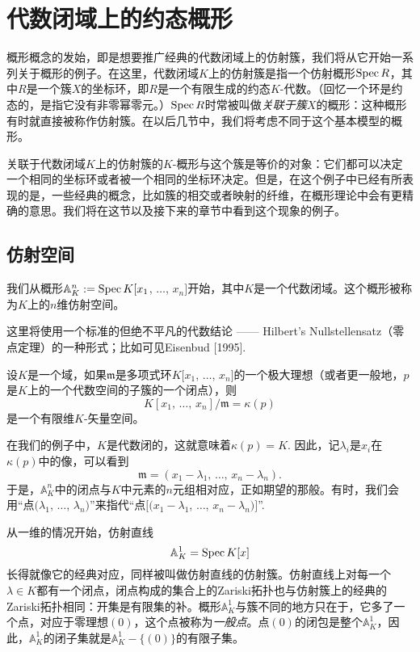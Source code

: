 \section{代数闭域上的约态概形}

概形概念的发始，即是想要推广经典的代数闭域上的仿射簇，我们将从它开始一系列关于概形的例子。在这里，代数闭域$K$上的仿射簇是指一个仿射概形$\operatorname{Spec} R$，其中$R$是一个簇$X$的坐标环，即$R$是一个有限生成的约态$K$-代数。（回忆一个环是约态的，是指它没有非零幂零元。）$\operatorname{Spec} R$时常被叫做\textit{关联于簇$X$}的概形：这种概形有时就直接被称作仿射簇。在以后几节中，我们将考虑不同于这个基本模型的概形。

关联于代数闭域$K$上的仿射簇的$K$-概形与这个簇是等价的对象：它们都可以决定一个相同的坐标环或者被一个相同的坐标环决定。但是，在这个例子中已经有所表现的是，一些经典的概念，比如簇的相交或者映射的纤维，在概形理论中会有更精确的意思。我们将在这节以及接下来的章节中看到这个现象的例子。

\subsection{仿射空间}

我们从概形$\mathbb{A}^n_K:=\operatorname{Spec} K[x_1$, $\dots$, $x_n]$开始，其中$K$是一个代数闭域。这个概形被称为$K$上的$n$维仿射空间。

这里将使用一个标准的但绝不平凡的代数结论 ------ Hilbert's Nullstellensatz（零点定理）的一种形式；比如可见Eisenbud [1995].

\begin{thm}[Nullstellensatz]
	设$K$是一个域，如果$\mathfrak{m}$是多项式环$K[x_1$, $\dots$, $x_n]$的一个极大理想（或者更一般地，$p$是$K$上的一个代数空间的子簇的一个闭点），则
	\[
		K[x_1\text{, }\dots\text{, }x_n]/\mathfrak{m}=\kappa(p)
	\]
	是一个有限维$K$-矢量空间。
\end{thm}

在我们的例子中，$K$是代数闭的，这就意味着$\kappa(p)=K$. 因此，记$\lambda_i$是$x_i$在$\kappa(p)$中的像，可以看到
\[
	\mathfrak{m}=(x_1-\lambda_1\text{, }\dots\text{, }x_n-\lambda_n).
\]
于是，$\mathbb{A}^n_K$中的闭点与$K$中元素的$n$元组相对应，正如期望的那般。有时，我们会用“点$(\lambda_1$, $\dots$, $\lambda_n)$”来指代“点$[(x_1-\lambda_1$, $\dots$, $x_n-\lambda_n)]$”. 

从一维的情况开始，仿射直线
\[
	\mathbb{A}^1_K=\operatorname{Spec} K[x]
\]
长得就像它的经典对应，同样被叫做仿射直线的仿射簇。仿射直线上对每一个$\lambda\in K$都有一个闭点，闭点构成的集合上的Zariski拓扑也与仿射簇上的经典的Zariski拓扑相同：开集是有限集的补。概形$\mathbb{A}^1_K$与簇不同的地方只在于，它多了一个点，对应于零理想$(0)$，这个点被称为\textit{一般点}。点$(0)$的闭包是整个$\mathbb{A}^1_K$，因此，$\mathbb{A}^1_K$的闭子集就是$\mathbb{A}^1_K-\{(0)\}$的有限子集。

